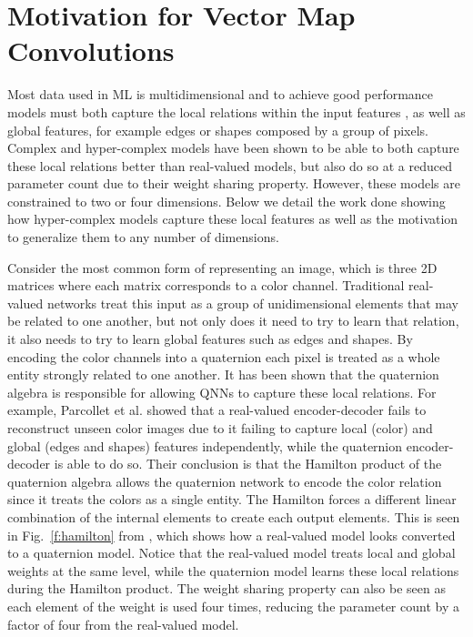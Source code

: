 \documentclass[14pt,a4paper]{article}
\begin{document}
\section{Motivation for Vector Map Convolutions}
Most data used in ML is multidimensional and to achieve good performance models must both capture the local relations within the input features \cite{tokuda2003trajectory, matsui2004quaternion}, as well as global features, for example edges or shapes composed by a group of pixels.
Complex and hyper-complex models have been shown to be able to both capture these local relations better than real-valued models, but also do so at a reduced parameter count due to their weight sharing property.
However, these models are constrained to two or four dimensions.
Below we detail the work done showing how hyper-complex models capture these local features as well as the motivation to generalize them to any number of dimensions.

Consider the most common form of representing an image, which is three 2D matrices where each matrix corresponds to a color channel.
Traditional real-valued networks treat this input as a group of unidimensional elements that may be related to one another, but not only does it need to try to learn that relation, it also needs to try to learn global features such as edges and shapes.
By encoding the color channels into a quaternion each pixel is treated as a whole entity strongly related to one another.
It has been shown that the quaternion algebra is responsible for allowing QNNs to capture these local relations. 
For example, Parcollet et al. \cite{parcollet2019quaternion} showed that a real-valued encoder-decoder fails to reconstruct unseen color images due to it failing to capture local (color) and global (edges and shapes) features independently, while the quaternion encoder-decoder is able to do so.
Their conclusion is that the Hamilton product of the quaternion algebra allows the quaternion network to encode the color relation since it treats the colors as a single entity.
The Hamilton forces a different linear combination of the internal elements to create each output elements.
This is seen in Fig.~\ref{f:hamilton} from \cite{parcollet2018quaternion-A}, which shows how a real-valued model looks converted to a quaternion model.
Notice that the real-valued model treats local and global weights at the same level, while the quaternion model learns these local relations during the Hamilton product.
The weight sharing property can also be seen as each element of the weight is used four times, reducing the parameter count by a factor of four from the real-valued model.
\end{document}
